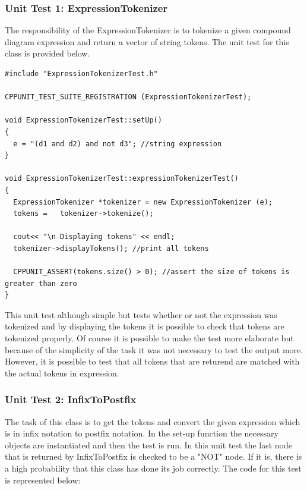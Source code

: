 \documentclass[10pt, a4paper, titlepage]{article}
\begin{document}
\subsubsection{Unit Test 1: ExpressionTokenizer}
The responsibility of the ExpressionTokenizer is to tokenize a given compound diagram expression and return a vector of string tokens. The unit test for this class is provided below.
\small
\begin{lstlisting}
#include "ExpressionTokenizerTest.h"

CPPUNIT_TEST_SUITE_REGISTRATION (ExpressionTokenizerTest);

void ExpressionTokenizerTest::setUp()
{
  e = "(d1 and d2) and not d3"; //string expression
}

void ExpressionTokenizerTest::expressionTokenizerTest()
{
  ExpressionTokenizer *tokenizer = new ExpressionTokenizer (e);
  tokens =   tokenizer->tokenize();

  cout<< "\n Displaying tokens" << endl;   
  tokenizer->displayTokens(); //print all tokens

  CPPUNIT_ASSERT(tokens.size() > 0); //assert the size of tokens is greater than zero
}
\end{lstlisting}
\large

This unit test although simple but tests whether or not the expression was tokenized and by displaying the tokens it is possible to check that tokens are tokenized properly. Of course it is possible to make the test more elaborate but because of the simplicity of the task it was not necessary to test the output more. However, it is possible to test that all tokens that are returend are matched with the actual tokens in expression.
  
\subsubsection{Unit Test 2: InfixToPostfix}
The task of this class is to get the tokens and convert the given expression which is in infix notation to postfix notation. In the set-up function the necessary objects are instantiated and then the test is run. In this unit test the last node that is returned by InfixToPostfix is checked to be a "NOT" node. If it is, there is a high probability that this class has done its job correctly. The code for this test is represented below:
  
\end{document}
